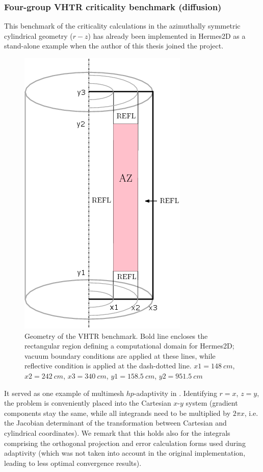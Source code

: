 \subsubsection{Four-group VHTR criticality benchmark (diffusion)}
This benchmark of the criticality calculations in the azimuthally symmetric cylindrical geometry ($r-z$) has already
been implemented in Hermes2D as a stand-alone example when the author of this thesis joined the project. 
\begin{figure}[!htb]
\begin{center}
  \includegraphics[scale=.4]{vhtr/VHTR}
  \caption[Geometry of the VHTR benchmark]{Geometry of the VHTR benchmark. Bold line encloses the rectangular region
  defining a computational domain for Hermes2D; vacuum boundary conditions are applied at these lines, while reflective
  condition is applied at the dash-dotted line. 
  $x1 = \SI{148}{cm}$,
  $x2 = \SI{242}{cm}$,
$x3 = \SI{340}{cm}$,
$y1 = \SI{158.5}{cm}$,
$y2 = \SI{951.5}{cm}$}
  \label{fig:70}
\end{center}
\end{figure}
It served as one example of
multimesh $hp$-adaptivity in \cite{Hermes-nuclear}. Identifying $r = x$, $z = y$, the problem is conveniently placed
into the Cartesian $x$-$y$ system (gradient components stay the same, while all
integrands need to be multiplied by $2\pi x$, i.e. the Jacobian determinant of the transformation between
Cartesian and cylindrical coordinates). We remark that this holds also for the integrals comprising the orthogonal
projection and error calculation forms used during adaptivity (which was not taken into account in the original
implementation, leading to less optimal convergence results).



